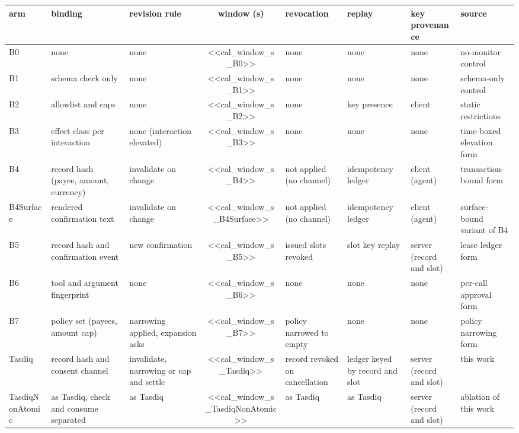 \begin{tabular}{l>{\raggedright\arraybackslash}p{1.0in}>{\raggedright\arraybackslash}p{0.95in}c>{\raggedright\arraybackslash}p{0.8in}>{\raggedright\arraybackslash}p{0.75in}>{\raggedright\arraybackslash}p{0.65in}>{\raggedright\arraybackslash}p{0.85in}}
\toprule
arm & binding & revision rule & window (s) & revocation & replay & key provenance & source \\
\midrule
B0 & none & none & <<cal_window_s_B0>> & none & none & none & no-monitor control \\
B1 & schema check only & none & <<cal_window_s_B1>> & none & none & none & schema-only control \\
B2 & allowlist and caps & none & <<cal_window_s_B2>> & none & key presence & client & static restrictions \\
B3 & effect class per interaction & none (interaction elevated) & <<cal_window_s_B3>> & none & none & none & time-boxed elevation form \\
B4 & record hash (payee, amount, currency) & invalidate on change & <<cal_window_s_B4>> & not applied (no channel) & idempotency ledger & client (agent) & transaction-bound form \\
B4Surface & rendered confirmation text & invalidate on change & <<cal_window_s_B4Surface>> & not applied (no channel) & idempotency ledger & client (agent) & surface-bound variant of B4 \\
B5 & record hash and confirmation event & new confirmation & <<cal_window_s_B5>> & issued slots revoked & slot key replay & server (record and slot) & lease ledger form \\
B6 & tool and argument fingerprint & none & <<cal_window_s_B6>> & none & none & none & per-call approval form \\
B7 & policy set (payees, amount cap) & narrowing applied, expansion asks & <<cal_window_s_B7>> & policy narrowed to empty & none & none & policy narrowing form \\
Tasdiq & record hash and consent channel & invalidate, narrowing or cap and settle & <<cal_window_s_Tasdiq>> & record revoked on cancellation & ledger keyed by record and slot & server (record and slot) & this work \\
TasdiqNonAtomic & as Tasdiq, check and consume separated & as Tasdiq & <<cal_window_s_TasdiqNonAtomic>> & as Tasdiq & as Tasdiq & server (record and slot) & ablation of this work \\

\end{tabular}
